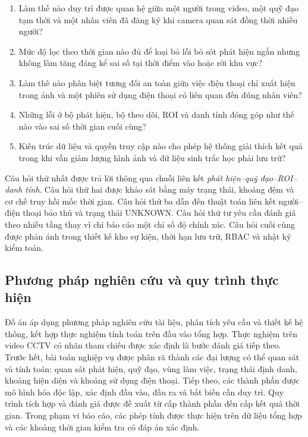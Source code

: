 \begin{enumerate}
\item Làm thế nào duy trì được quan hệ giữa một người trong video, một quỹ đạo tạm thời và một nhân viên đã đăng ký khi camera quan sát đồng thời nhiều người?
\item Mức độ lọc theo thời gian nào đủ để loại bỏ lỗi bỏ sót phát hiện ngắn nhưng không làm tăng đáng kể sai số tại thời điểm vào hoặc rời khu vực?
\item Làm thế nào phân biệt tương đối an toàn giữa việc điện thoại chỉ xuất hiện trong ảnh và một phiên sử dụng điện thoại có liên quan đến đúng nhân viên?
\item Những lỗi ở bộ phát hiện, bộ theo dõi, ROI và danh tính đóng góp như thế nào vào sai số thời gian cuối cùng?
\item Kiến trúc dữ liệu và quyền truy cập nào cho phép hệ thống giải thích kết quả trong khi vẫn giảm lượng hình ảnh và dữ liệu sinh trắc học phải lưu trữ?
\end{enumerate}

Câu hỏi thứ nhất được trả lời thông qua chuỗi liên kết \textit{phát hiện--quỹ đạo--ROI--danh tính}. Câu hỏi thứ hai được khảo sát bằng máy trạng thái, khoảng đệm và cơ chế truy hồi mốc thời gian. Câu hỏi thứ ba dẫn đến thuật toán liên kết người--điện thoại bảo thủ và trạng thái UNKNOWN. Câu hỏi thứ tư yêu cầu đánh giá theo nhiều tầng thay vì chỉ báo cáo một chỉ số độ chính xác. Câu hỏi cuối cùng được phản ánh trong thiết kế kho sự kiện, thời hạn lưu trữ, RBAC và nhật ký kiểm toán.

\subsection{Phương pháp nghiên cứu và quy trình thực hiện}
Đồ án áp dụng phương pháp nghiên cứu tài liệu, phân tích yêu cầu và thiết kế hệ thống, kết hợp thực nghiệm tính toán trên đầu vào tổng hợp. Thực nghiệm trên video CCTV có nhãn tham chiếu được xác định là bước đánh giá tiếp theo. Trước hết, bài toán nghiệp vụ được phân rã thành các đại lượng có thể quan sát và tính toán: quan sát phát hiện, quỹ đạo, vùng làm việc, trạng thái định danh, khoảng hiện diện và khoảng sử dụng điện thoại. Tiếp theo, các thành phần được mô hình hóa độc lập, xác định đầu vào, đầu ra và bất biến cần duy trì. Quy trình tích hợp và đánh giá được đề xuất từ cấp thành phần đến cấp kết quả thời gian. Trong phạm vi báo cáo, các phép tính được thực hiện trên dữ liệu tổng hợp và các khoảng thời gian kiểm tra có đáp án xác định.

